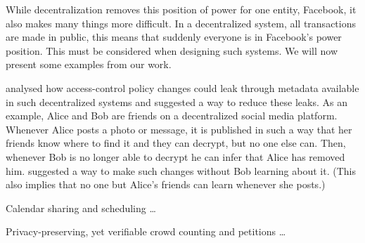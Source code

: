 While decentralization removes this position of power for one entity, \eg 
Facebook, it also makes many things more difficult.
In a decentralized system, all transactions are made in public, this means that 
suddenly everyone is in Facebook's power position.
This must be considered when designing such systems.
We will now present some examples from our work.

\Textcite{PPACinPubFS} analysed how access-control policy changes could leak 
through metadata available in such decentralized systems and suggested a way to 
reduce these leaks.
As an example, Alice and Bob are friends on a decentralized social media 
platform.
Whenever Alice posts a photo or message, it is published in such a way that her 
friends know where to find it and they can decrypt, but no one else can.
Then, whenever Bob is no longer able to decrypt he can infer that Alice has 
removed him.
\Textcite{PPACinPubFS} suggested a way to make such changes without Bob 
learning about it.
(This also implies that no one but Alice's friends can learn whenever she 
posts.)

Calendar sharing and scheduling
\dots

Privacy-preserving, yet verifiable crowd counting and petitions
\dots



\begin{frame}[allowframebreaks]
  \printbibliography
\end{frame}
